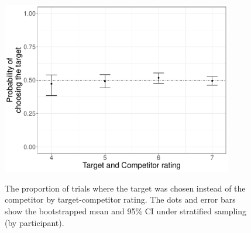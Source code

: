\documentclass[12pt, a4paper]{article}
\begin{document}
\begin{appendices}
\begin{figure}[htb!]
\centering
		\caption{The proportion of trials where the target was chosen instead of the competitor by target-competitor rating. The dots and error bars show the bootstrapped mean and 95\% CI under stratified sampling (by participant).}
\includegraphics[width=0.9\textwidth]{figure7.pdf}
\label{fig:exp2_res_app2}
\end{figure}

\end{appendices}
\end{document}
